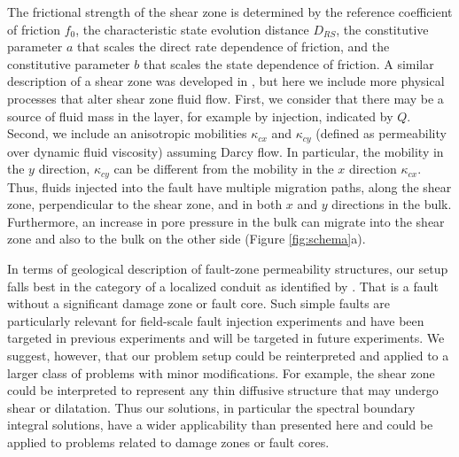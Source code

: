 \documentclass[draft]{agujournal2019}
\begin{document}
The frictional strength of the shear zone is determined by the reference coefficient of friction $f_0$, the characteristic state evolution distance $D_{RS}$, the constitutive parameter $a$ that scales the direct rate dependence of friction, and the constitutive parameter $b$ that scales the state dependence of friction. A similar description of a shear zone was developed in , but here we include more physical processes that alter shear zone fluid flow. First, we consider that there may be a source of fluid mass in the layer, for example by injection, indicated by $Q$. Second, we include an anisotropic mobilities $\kappa_{cx}$ and $\kappa_{cy}$ (defined as permeability over dynamic fluid viscosity) assuming Darcy flow. In particular, the mobility in the $y$ direction, $\kappa_{cy}$ can be different from the mobility in the $x$ direction $\kappa_{cx}$. Thus, fluids injected into the fault have multiple migration paths, along the shear zone, perpendicular to the shear zone, and in both $x$ and $y$ directions in the bulk. Furthermore, an increase in pore pressure in the bulk can migrate into the shear zone and also to the bulk on the other side (Figure \ref{fig:schema}a).

In terms of geological description of fault-zone permeability structures, our setup falls best in the category of a localized conduit as identified by . That is a fault without a significant damage zone or fault core. Such simple faults are particularly relevant for field-scale fault injection experiments and have been targeted in previous experiments \cite{Guglielmi2015} and will be targeted in future \cite{Ma2022} experiments. We suggest, however, that our problem setup could be reinterpreted and applied to a larger class of problems with minor modifications. For example, the shear zone could be interpreted to represent any thin diffusive structure that may undergo shear or dilatation. Thus our solutions, in particular the spectral boundary integral solutions, have a wider applicability than presented here and could be applied to problems related to damage zones or fault cores.
\end{document}
